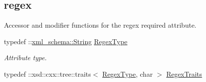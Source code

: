 \subsection*{regex}
\label{_amgrp44c5b763d21e9a3ed8cad56977bfd75c}
Accessor and modifier functions for the regex required attribute. \begin{DoxyCompactItemize}
\item 
\hypertarget{classopenstack_1_1xml_1_1RateLimit_a548c5e538a1408da78611116ac40aab2}{
typedef ::\hyperlink{namespacexml__schema_af6757b5701ccc893f3b551bd70e0c94d}{xml\_\-schema::String} \hyperlink{classopenstack_1_1xml_1_1RateLimit_a548c5e538a1408da78611116ac40aab2}{RegexType}}
\label{classopenstack_1_1xml_1_1RateLimit_a548c5e538a1408da78611116ac40aab2}

\begin{DoxyCompactList}\small\item\em Attribute type. \item\end{DoxyCompactList}\item 
\hypertarget{classopenstack_1_1xml_1_1RateLimit_afdd76b932e3086fe3eaf3f1735e069e6}{
typedef ::xsd::cxx::tree::traits$<$ \hyperlink{classopenstack_1_1xml_1_1RateLimit_a548c5e538a1408da78611116ac40aab2}{RegexType}, char $>$ \hyperlink{classopenstack_1_1xml_1_1RateLimit_afdd76b932e3086fe3eaf3f1735e069e6}{RegexTraits}}
\label{classopenstack_1_1xml_1_1RateLimit_afdd76b932e3086fe3eaf3f1735e069e6}


\end{DoxyCompactItemize}
